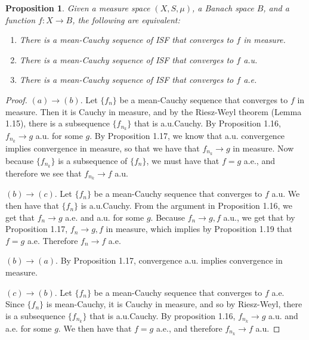 \documentclass[a4paper,12pt]{report}
\newtheorem{prop}[theorem]{Proposition}
\begin{document}
	\begin{prop}
	Given a measure space $(X, S, \mu)$, a Banach space $B$, and a function $f : X \rightarrow B$, the following are equivalent:
		\begin{enumerate}[label=(\alph*)]
			\item There is a mean-Cauchy sequence of ISF that converges to $f$ in measure. 
			\item There is a mean-Cauchy sequence of ISF that converges to $f$ a.u.
			\item There is a mean-Cauchy sequence of ISF that converges to $f$ a.e.
		\end{enumerate}
	\end{prop}
	\begin{proof}
	$(a) \rightarrow (b)$. Let $\{f_n\}$ be a mean-Cauchy sequence that converges to $f$ in measure. Then it is Cauchy in measure, and by the Riesz-Weyl theorem (Lemma 1.15), there is a subsequence $\{f_{n_k}\}$ that is a.u.Cauchy. By Proposition 1.16, $f_{n_k} \rightarrow g$ a.u. for some $g$. By Proposition 1.17, we know that a.u. convergence implies convergence in measure, so that we have that $f_{n_k} \rightarrow g$ in measure. Now because $\{f_{n_k}\}$ is a subsequence of $\{f_n\}$, we must have that $f = g$ a.e., and therefore we see that $f_{n_k} \rightarrow f$ a.u. 
	
	$(b) \rightarrow (c)$. Let $\{f_n\}$ be a mean-Cauchy sequence that converges to $f$ a.u. We then have that $\{f_n\}$ is a.u.Cauchy. From the argument in Proposition 1.16, we get that $f_n \rightarrow g$ a.e. and a.u. for some $g$. Because $f_n \rightarrow g, f$ a.u., we get that by Proposition 1.17,  $f_n \rightarrow g, f$ in measure, which implies by Proposition 1.19 that $f = g$ a.e. Therefore $f_n \rightarrow f$ a.e.
	
	$(b) \rightarrow (a)$. By Proposition 1.17, convergence a.u. implies convergence in measure. 
	
	$(c) \rightarrow (b)$. Let $\{f_n\}$ be a mean-Cauchy sequence that converges to $f$ a.e. Since $\{f_n\}$ is mean-Cauchy, it is Cauchy in measure, and so by Riesz-Weyl, there is a subsequence $\{f_{n_k}\}$ that is a.u.Cauchy. By proposition 1.16, $f_{n_k} \rightarrow g$ a.u. and a.e. for some $g$. We then have that $f = g$ a.e., and therefore $f_{n_k} \rightarrow f$ a.u. 
	
	\end{proof}
	
\end{document}
